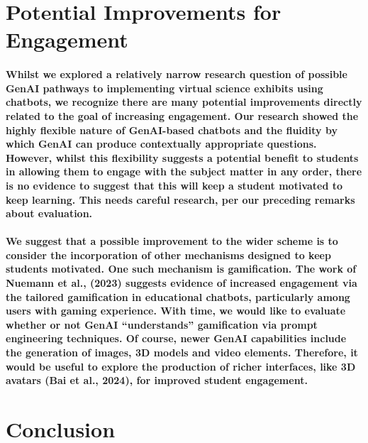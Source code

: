 \documentclass{article}
\begin{document}
\section*{Potential Improvements for Engagement}

\paragraph{Whilst we explored a relatively narrow research question of possible GenAI pathways to implementing virtual science exhibits using chatbots, we recognize there are many potential improvements directly related to the goal of increasing engagement. Our research showed the highly flexible nature of GenAI-based chatbots and the fluidity by which GenAI can produce contextually appropriate questions. However, whilst this flexibility suggests a potential benefit to students in allowing them to engage with the subject matter in any order, there is no evidence to suggest that this will keep a student motivated to keep learning. This needs careful research, per our preceding remarks about evaluation.}

\paragraph{We suggest that a possible improvement to the wider scheme is to consider the incorporation of other mechanisms designed to keep students motivated. One such mechanism is gamification. The work of Nuemann et al., (2023) suggests evidence of increased engagement via the tailored gamification in educational chatbots, particularly among users with gaming experience. With time, we would like to evaluate whether or not GenAI “understands” gamification via prompt engineering techniques. Of course, newer GenAI capabilities include the generation of images, 3D models and video elements. Therefore, it would be useful to explore the production of richer interfaces, like 3D avatars (Bai et al., 2024), for improved student engagement.}

\section*{Conclusion}
\end{document}

